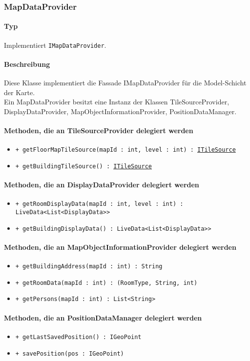 \subsubsection{MapDataProvider}\label{App_Map_Model_MapDataProvider}
\paragraph*{Typ}
Implementiert \texttt{IMapDataProvider}.
\paragraph*{Beschreibung}
Diese Klasse implementiert die Fassade IMapDataProvider für die Model-Schicht der Karte.\\
Ein MapDataProvider besitzt eine Instanz der Klassen 
TileSourceProvider, DisplayDataProvider, MapObjectInformationProvider, PositionDataManager.

\paragraph*{Methoden, die an TileSourceProvider delegiert werden}
\begin{itemize}
    \item \texttt{+ getFloorMapTileSource(mapId : int, level : int) : \href{https://osmdroid.github.io/osmdroid/javadocAll/org/osmdroid/tileprovider/tilesource/ITileSource.html}{ITileSource}}
    \item \texttt{+ getBuildingTileSource() : \href{https://osmdroid.github.io/osmdroid/javadocAll/org/osmdroid/tileprovider/tilesource/ITileSource.html}{ITileSource}}
\end{itemize}

\paragraph*{Methoden, die an DisplayDataProvider delegiert werden}
\begin{itemize}
    \item \texttt{+ getRoomDisplayData(mapId : int, level : int) : LiveData<List<DisplayData>>}
    \item \texttt{+ getBuildingDisplayData() : LiveData<List<DisplayData>>}
\end{itemize}

\paragraph*{Methoden, die an MapObjectInformationProvider delegiert werden}
\begin{itemize}
    \item \texttt{+ getBuildingAddress(mapId : int) : String}
    \item \texttt{+ getRoomData(mapId : int) : (RoomType, String, int)}
    \item \texttt{+ getPersons(mapId : int) : List<String>}
\end{itemize}

\paragraph*{Methoden, die an PositionDataManager delegiert werden}
\begin{itemize}
    \item \texttt{+ getLastSavedPosition() : IGeoPoint}
    \item \texttt{+ savePosition(pos : IGeoPoint)}
\end{itemize}
